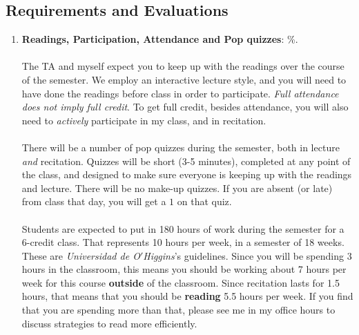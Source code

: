 \documentclass[letterpaper]{article}
\begin{document}
\subsection*{Requirements and Evaluations}

\begin{enumerate}

	\item {\bf Readings, Participation, Attendance and Pop quizzes}: {\unskip}\%.
	\\
	\\
	The TA and myself expect you to keep up with the readings over the course of the semester. We employ an interactive lecture style, and you will need to have done the readings before class in order to participate. \emph{Full attendance does not imply full credit}. To get full credit, besides attendance, you will also need to \emph{actively} participate in my class, and in recitation.
\\
\\	
	There will be a number of pop quizzes during the semester, both in lecture \emph{and} recitation. Quizzes will be short (3-5 minutes), completed at any point of the class, and designed to make sure everyone is keeping up with the readings and lecture. There will be no make-up quizzes. If you are absent (or late) from class that day, you will get a $1$ on that quiz. 
	\\
	\\
	Students are expected to put in 180 hours of work during the semester for a 6-credit class. That represents 10 hours per week, in a semester of 18 weeks. These are \emph{Universidad de O$'$Higgins}'s guidelines. Since you will be spending 3 hours in the classroom, this means you should be working about 7 hours per week for this course {\bf outside} of the classroom. Since recitation lasts for 1.5 hours, that means that you should be {\bf reading} 5.5 hours per week. If you find that you are spending more than that, please see me in my office hours to discuss strategies to read more efficiently. 



\end{enumerate}
\end{document}
